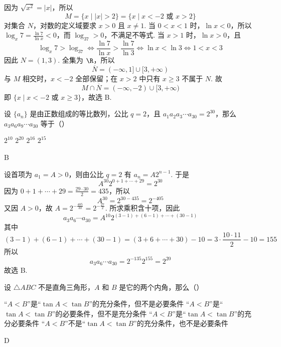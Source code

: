 \begin{solution}
因为 \(\sqrt{x^2}=|x|\)，所以
\[
M=\{x\mid |x|>2\}=\{x\mid x<-2\text{ 或 }x>2\}
\]
对集合 \(N\)，对数的定义域要求 \(x>0\) 且 \(x\ne1\). 当 \(0<x<1\) 时，\(\ln x<0\)，所以 \(\log_x7=\frac{\ln7}{\ln x}<0\)，而 \(\log_37>0\)，不满足不等式. 当 \(x>1\) 时，\(\ln x>0\)，且
\[
\log_x7>\log_37\Longleftrightarrow \frac{\ln7}{\ln x}>\frac{\ln7}{\ln3}
\Longleftrightarrow \ln x<\ln3
\Longleftrightarrow 1<x<3
\]
因此 \(N=(1,3)\). 全集为 \(\R\)，所以
\[
\overline N=(-\infty,1]\cup[3,+\infty)
\]
与 \(M\) 相交时，\(x<-2\) 全部保留；在 \(x>2\) 中只有 \(x\geqslant3\) 不属于 \(N\). 故
\[
M\cap\overline N=(-\infty,-2)\cup[3,+\infty)
\]
即 \(\{x\mid x<-2\text{ 或 }x\geqslant3\}\)，故选 B.
\end{solution}

\begin{problem}
设 \(\{a_n\}\) 是由正数组成的等比数列，公比 \(q=2\)，且 \(a_1a_2a_3\cdots a_{30}=2^{30}\)，那么 \(a_3a_6a_9\cdots a_{30}\) 等于（\quad）

\choices
    {\(2^{10}\)}
    {\(2^{20}\)}
    {\(2^{16}\)}
    {\(2^{15}\)}
\end{problem}

\begin{answer}
B
\end{answer}

\begin{solution}
设首项为 \(a_1=A>0\)，则由公比 \(q=2\) 有 \(a_n=A2^{n-1}\). 于是
\[
A^{30}2^{0+1+\cdots+29}=2^{30}
\]
因为 \(0+1+\cdots+29=\frac{29\cdot30}{2}=435\)，所以
\[
A^{30}=2^{30-435}=2^{-405}
\]
又因 \(A>0\)，故 \(A=2^{-\frac{405}{30}}=2^{-\frac{27}{2}}\). 所求乘积含十项，因此
\[
a_3a_6\cdots a_{30}=A^{10}2^{(3-1)+(6-1)+\cdots+(30-1)}
\]
其中
\[
(3-1)+(6-1)+\cdots+(30-1)=(3+6+\cdots+30)-10=3\cdot\frac{10\cdot11}{2}-10=155
\]
所以
\[
a_3a_6\cdots a_{30}=2^{-135}2^{155}=2^{20}
\]
故选 B.
\end{solution}

\begin{problem}
设 \(\triangle ABC\) 不是直角三角形，\(A\) 和 \(B\) 是它的两个内角，那么（\quad）

\choices
    {“\(A<B\)”是“\(\tan A<\tan B\)”的充分条件，但不是必要条件}
    {“\(A<B\)”是“\(\tan A<\tan B\)”的必要条件，但不是充分条件}
    {“\(A<B\)”是“\(\tan A<\tan B\)”的充分必要条件}
    {“\(A<B\)”不是“\(\tan A<\tan B\)”的充分条件，也不是必要条件}
\end{problem}

\begin{answer}
D
\end{answer}

